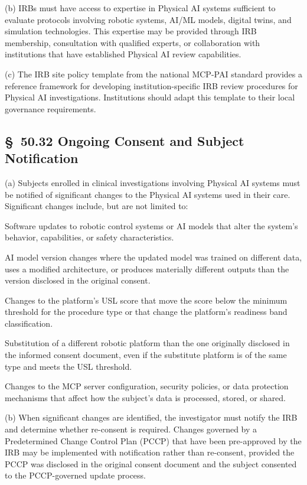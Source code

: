 \documentclass[11pt]{article}
\begin{document}
(b) IRBs must have access to expertise in Physical AI systems sufficient to evaluate protocols involving robotic systems, AI/ML models, digital twins, and simulation technologies. This expertise may be provided through IRB membership, consultation with qualified experts, or collaboration with institutions that have established Physical AI review capabilities.

(c) The IRB site policy template from the national MCP-PAI standard provides a reference framework for developing institution-specific IRB review procedures for Physical AI investigations. Institutions should adapt this template to their local governance requirements.

\subsection{\S~50.32 Ongoing Consent and Subject Notification}

(a) Subjects enrolled in clinical investigations involving Physical AI systems must be notified of significant changes to the Physical AI systems used in their care. Significant changes include, but are not limited to:

\begin{description}[leftmargin=1.0cm,style=sameline]
\item[(1)] Software updates to robotic control systems or AI models that alter the system's behavior, capabilities, or safety characteristics.
\item[(2)] AI model version changes where the updated model was trained on different data, uses a modified architecture, or produces materially different outputs than the version disclosed in the original consent.
\item[(3)] Changes to the platform's USL score that move the score below the minimum threshold for the procedure type or that change the platform's readiness band classification.
\item[(4)] Substitution of a different robotic platform than the one originally disclosed in the informed consent document, even if the substitute platform is of the same type and meets the USL threshold.
\item[(5)] Changes to the MCP server configuration, security policies, or data protection mechanisms that affect how the subject's data is processed, stored, or shared.
\end{description}

(b) When significant changes are identified, the investigator must notify the IRB and determine whether re-consent is required. Changes governed by a Predetermined Change Control Plan (PCCP) that have been pre-approved by the IRB may be implemented with notification rather than re-consent, provided the PCCP was disclosed in the original consent document and the subject consented to the PCCP-governed update process.
\end{document}
